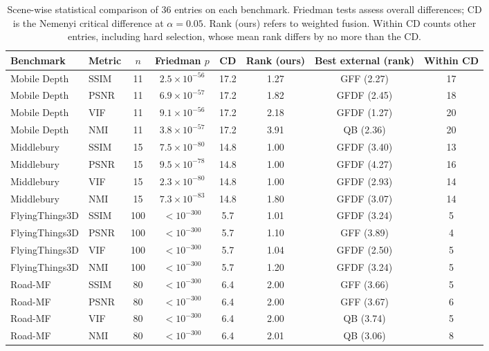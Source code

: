 \begin{table}[!htbp]
\centering
\scriptsize
\setlength{\tabcolsep}{3pt}
\caption{Scene-wise statistical comparison of 36 entries on each benchmark. Friedman tests assess overall differences; CD is the Nemenyi critical difference at $\alpha=0.05$. Rank (ours) refers to weighted fusion. Within CD counts other entries, including hard selection, whose mean rank differs by no more than the CD.}
\label{tab:stats}
\begin{tabular}{llcccccc}
\toprule
Benchmark & Metric & $n$ & Friedman $p$ & CD & Rank (ours) & Best external (rank) & Within CD \\
\midrule
Mobile Depth & SSIM & 11 & $2.5\times10^{-56}$ & 17.2 & 1.27 & GFF (2.27) & 17 \\
Mobile Depth & PSNR & 11 & $6.9\times10^{-57}$ & 17.2 & 1.82 & GFDF (2.45) & 18 \\
Mobile Depth & VIF & 11 & $9.1\times10^{-56}$ & 17.2 & 2.18 & GFDF (1.27) & 20 \\
Mobile Depth & NMI & 11 & $3.8\times10^{-57}$ & 17.2 & 3.91 & QB (2.36) & 20 \\
Middlebury & SSIM & 15 & $7.5\times10^{-80}$ & 14.8 & 1.00 & GFDF (3.40) & 13 \\
Middlebury & PSNR & 15 & $9.5\times10^{-78}$ & 14.8 & 1.00 & GFDF (4.27) & 16 \\
Middlebury & VIF & 15 & $2.3\times10^{-80}$ & 14.8 & 1.00 & GFDF (2.93) & 14 \\
Middlebury & NMI & 15 & $7.3\times10^{-83}$ & 14.8 & 1.80 & GFDF (3.07) & 14 \\
FlyingThings3D & SSIM & 100 & $<10^{-300}$ & 5.7 & 1.01 & GFDF (3.24) & 5 \\
FlyingThings3D & PSNR & 100 & $<10^{-300}$ & 5.7 & 1.10 & GFF (3.89) & 4 \\
FlyingThings3D & VIF & 100 & $<10^{-300}$ & 5.7 & 1.04 & GFDF (2.50) & 5 \\
FlyingThings3D & NMI & 100 & $<10^{-300}$ & 5.7 & 1.20 & GFDF (3.24) & 5 \\
Road-MF & SSIM & 80 & $<10^{-300}$ & 6.4 & 2.00 & GFF (3.66) & 5 \\
Road-MF & PSNR & 80 & $<10^{-300}$ & 6.4 & 2.00 & GFF (3.67) & 6 \\
Road-MF & VIF & 80 & $<10^{-300}$ & 6.4 & 2.00 & QB (3.74) & 5 \\
Road-MF & NMI & 80 & $<10^{-300}$ & 6.4 & 2.01 & QB (3.06) & 8 \\
\bottomrule
\end{tabular}
\end{table}
